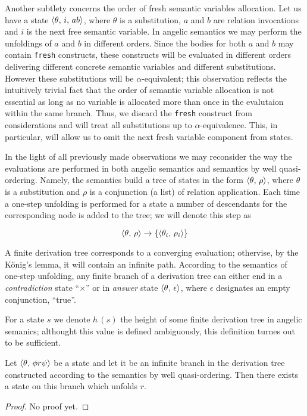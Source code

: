 Another subtlety concerns the order of fresh semantic variables allocation. Let us have a state $\langle \theta,\,i,\,ab \rangle$, where
$\theta$ is a substitution, $a$ and $b$ are relation invocations and $i$ is the next free semantic variable. In angelic semantics we
may perform the unfoldings of $a$ and $b$ in different orders. Since the bodies for both $a$ and $b$ may contain \lstinline|fresh| constructs,
these constructs will be evaluated in different orders delivering different concrete semantic variables and different substitutions. However
these substitutions will be $\alpha$-equivalent; this observation reflects the intuitively trivial fact that the order of semantic variable
allocation is not essential as long as no variable is allocated more than once in the evalutaion within the same branch. Thus, we discard
the \lstinline|fresh| construct from considerations and will treat all substitutions up to $\alpha$-equivalence. This, in particular,
will allow us to omit the next fresh variable component from states.

In the light of all previously made observations we may reconsider the way the evaluations are performed in both
angelic semantics and semantics by well quasi-ordering. Namely, the semantics build a tree of states in the form
$\langle \theta,\,\rho \rangle$, where $\theta$ is a substitution and $\rho$ is a conjunction (a list) of relation application.
Each time a one-step unfolding is performed for a state a number of descendants for the corresponding node is
added to the tree; we will denote this step as

\[
\langle \theta,\,\rho \rangle\to\{\langle \theta_i,\,\rho_i \rangle\}
\]

A finite derivation tree corresponds to a converging evaluation; othervise, by the K\H{o}nig's lemma, it will contain an infinite path. 
According to the semantics of one-step unfolding, any finite branch of a derivation tree can either end in a \emph{contradiction} state ``$\times$''
or in \emph{answer} state $\langle \theta,\,\epsilon \rangle$, where $\epsilon$ designates an empty conjunction, ``true''.

For a state $s$ we denote $h\,(s)$ the height of some finite derivation tree in angelic semanics; althought this value is defined ambiguously, this
definition turnes out to be sufficient.

\begin{lemma}
  \label{lem:liveness}
  Let $\langle \theta,\,\phi r \psi \rangle$ be a state and let it be an infinite branch in the derivation tree constructed according to the semantics by well
  quasi-ordering. Then there exists a state on this branch which unfolds $r$.
\end{lemma}
\begin{proof}
  No proof yet.
\end{proof}

